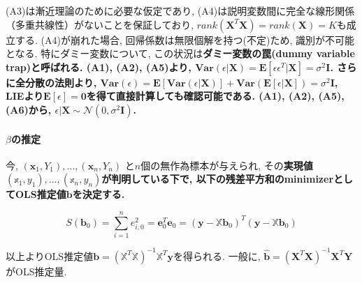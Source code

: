 \documentclass[paper=a4paper,fontsize=10pt]{jlreq}
\begin{document}
(A3)は漸近理論のために必要な仮定であり, (A4)は説明変数間に完全な線形関係（多重共線性）がないことを保証しており, $rank(\mathbf{X}^T\mathbf{X})=rank(\mathbf{X})=K$も成立する. (A4)が崩れた場合, 回帰係数は無限個解を持つ(不定)ため, 識別が不可能となる. 特にダミー変数について, この状況は\rmfamily\mcfamily\bfseries{ダミー変数の罠(dummy variable trap)}\mdseries と呼ばれる. (A1), (A2), (A5)より, $\mathbf{Var}(\epsilon | \mathbf{X})=\mathbf{E}[\epsilon\epsilon^T| \mathbf{X}]=\sigma^2\mathbf{I}$. さらに全分散の法則より, $\mathbf{Var}(\epsilon)=\mathbf{E}[\mathbf{Var}(\epsilon | \mathbf{X})]+\mathbf{Var}(\mathbf{E}[\epsilon | \mathbf{X}])=\sigma^2\mathbf{I}$, LIEより$\mathbf{E}[\epsilon]=\mathbf{0}$を得て直接計算しても確認可能である. (A1), (A2), (A5), (A6)から, $\epsilon|\mathbf{X} \sim \mathcal{N} (0, \sigma^{2}\mathbf{I})$.\\

\paragraph{$\beta$の推定}
今, $(\mathbf{x}_{1}, Y_1), \dots, (\mathbf{x}_{n}, Y_n)$ と$n$個の無作為標本が与えられ, その\rmfamily\mcfamily\bfseries{実現値}\mdseries$(\mathbb{x}_{1}, y_1), \dots, (\mathbb{x}_{n}, y_n)$が判明している下で, 以下の残差平方和のminimizerとしてOLS推定値$\mathbf{b}$を決定する.

\begin{equation*}
  S(\mathbf{b}_{0})=\sum_{i = 1}^{n} e_{i,0}^{2}=\mathbf{e}_{0}^{T}\mathbf{e}_{0}=(\mathbf{y}-\mathbb{X}\mathbf{b}_{0})^{T}(\mathbf{y}-\mathbb{X}\mathbf{b}_{0})
\end{equation*}

以上よりOLS推定値$\mathbf{b}=(\mathbb{X}^{T}\mathbb{X})^{-1}\mathbb{X}^{T}\mathbf{y}$を得られる. 一般に, $\hat{\mathbf{b}}=(\mathbf{X}^{T}\mathbf{X})^{-1}\mathbf{X}^{T}\mathbf{Y}$がOLS推定量.\\
\end{document}
